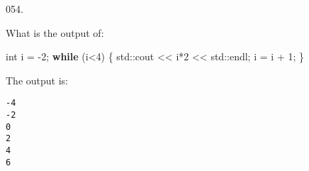 \documentclass[]{book}
\newenvironment{Shaded}{}{}
\newcommand{\BuiltInTok}[1]{#1}
\newcommand{\ControlFlowTok}[1]{\textcolor[rgb]{0.00,0.44,0.13}{\textbf{#1}}}
\newcommand{\DataTypeTok}[1]{\textcolor[rgb]{0.56,0.13,0.00}{#1}}
\newcommand{\DecValTok}[1]{\textcolor[rgb]{0.25,0.63,0.44}{#1}}
\newcommand{\NormalTok}[1]{#1}
\begin{document}
\begin{minipage}{\linewidth}\noindent
{\tiny 054.}\\
\begin{minipage}[t]{.485\linewidth}

What is the output of:

\begin{framed}

\begin{Shaded}
\begin{Highlighting}[]
\DataTypeTok{int}\NormalTok{ i = }\DecValTok{-2}\NormalTok{;}
\ControlFlowTok{while}\NormalTok{ (i<}\DecValTok{4}\NormalTok{) \{}
  \BuiltInTok{std::}\NormalTok{cout << i*}\DecValTok{2}\NormalTok{ << }\BuiltInTok{std::}\NormalTok{endl;}
\NormalTok{  i = i + }\DecValTok{1}\NormalTok{;}
\NormalTok{\}}
\end{Highlighting}
\end{Shaded}

\end{framed}

\end{minipage}
\hfill
\begin{minipage}[t]{.485\linewidth}

The output is:

\begin{framed}

\begin{verbatim}
-4
-2
0
2
4
6
\end{verbatim}

\end{framed}

\end{minipage}
\end{minipage}

\vspace{2mm}\noindent\hrulefill{}
\end{document}
